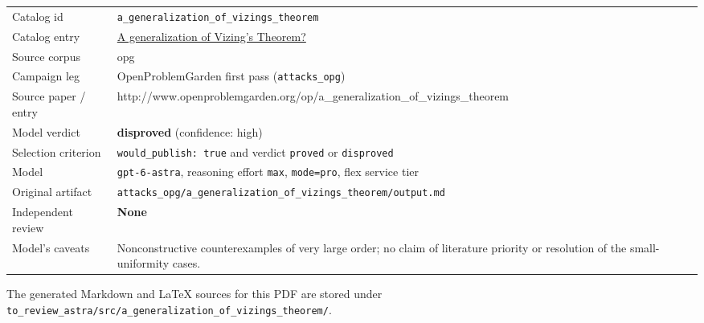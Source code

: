 \documentclass[
  11pt,
  a4paper,
]{article}
\newcounter{none} %
\begin{document}
{\def\LTcaptype{none} %
\begin{longtable}[]{@{}
  >{\raggedright\arraybackslash}p{}
  >{\raggedright\arraybackslash}p{}@{}}
\toprule\noalign{}
\endhead
\bottomrule\noalign{}
\endlastfoot
Catalog id & \texttt{a\_generalization\_of\_vizings\_theorem} \\
Catalog entry &
\href{https://graph-theory-ai.github.io/graph-conjectures/op/a_generalization_of_vizings_theorem/}{A
generalization of Vizing's Theorem?} \\
Source corpus & opg \\
Campaign leg & OpenProblemGarden first pass (\texttt{attacks\_opg}) \\
Source paper / entry &
http://www.openproblemgarden.org/op/a\_generalization\_of\_vizings\_theorem \\
Model verdict & \textbf{disproved} (confidence: high) \\
Selection criterion & \texttt{would\_publish:\ true} and verdict
\texttt{proved} or \texttt{disproved} \\
Model & \texttt{gpt-6-astra}, reasoning effort \texttt{max},
\texttt{mode=pro}, flex service tier \\
Original artifact &
\texttt{attacks\_opg/a\_generalization\_of\_vizings\_theorem/output.md} \\
Independent review & \textbf{None} \\
Model's caveats & Nonconstructive counterexamples of very large order;
no claim of literature priority or resolution of the small-uniformity
cases. \\
\end{longtable}
}

The generated Markdown and LaTeX sources for this PDF are stored under
\texttt{to\_review\_astra/src/a\_generalization\_of\_vizings\_theorem/}.
\end{document}
